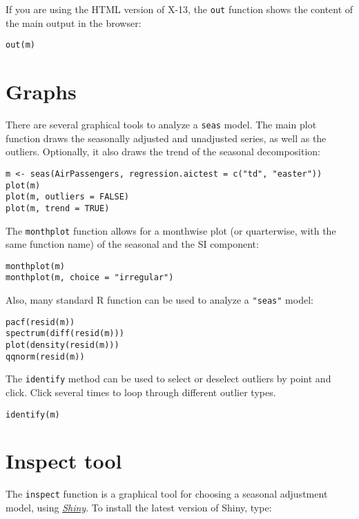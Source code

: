 If you are using the HTML version of X-13, the \texttt{out} function
shows the content of the main output in the browser:

\begin{verbatim}
out(m)
\end{verbatim}

\section{Graphs}\label{graphs}

There are several graphical tools to analyze a \texttt{seas} model. The
main plot function draws the seasonally adjusted and unadjusted series,
as well as the outliers. Optionally, it also draws the trend of the
seasonal decomposition:

\begin{verbatim}
m <- seas(AirPassengers, regression.aictest = c("td", "easter"))
plot(m)
plot(m, outliers = FALSE)
plot(m, trend = TRUE)
\end{verbatim}

The \texttt{monthplot} function allows for a monthwise plot (or
quarterwise, with the same function name) of the seasonal and the SI
component:

\begin{verbatim}
monthplot(m)
monthplot(m, choice = "irregular")
\end{verbatim}

Also, many standard R function can be used to analyze a \texttt{"seas"}
model:

\begin{verbatim}
pacf(resid(m))
spectrum(diff(resid(m)))
plot(density(resid(m)))
qqnorm(resid(m))
\end{verbatim}

The \texttt{identify} method can be used to select or deselect outliers
by point and click. Click several times to loop through different
outlier types.

\begin{verbatim}
identify(m)
\end{verbatim}

\section{Inspect tool}\label{inspect-tool}

The \texttt{inspect} function is a graphical tool for choosing a
seasonal adjustment model, using
\emph{\href{http://shiny.rstudio.com}{Shiny}}. To install the latest
version of Shiny, type:

